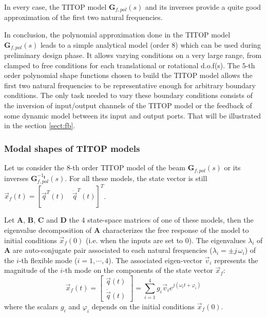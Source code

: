 \documentclass[smallcondensed]{svjour3}     %
\begin{document}
In every case, the TITOP model $\mathbf{G}_{f,pol}(s)$ and its inverses provide a quite good approximation of the first two natural frequencies.

In conclusion, the polynomial approximation done in the TITOP model $\mathbf{G}_{f,pol}(s)$ leads to a simple analytical model (order $8$) which can be used during preliminary design phase. It allows varying conditions on a very large range, from clamped to free conditions for each translational or rotational d.o.f(s). The $5$-th order polynomial shape functions chosen to build the TITOP model allows the first two natural frequencies to be representative enough for arbitrary boundary conditions. The only task needed to vary these boundary conditions consists of the inversion of input/output channels of the TITOP model or the feedback of some dynamic model between its input and output ports. That will be illustrated in the  section \ref{sect:fb}. 

\subsubsection{Modal shapes of TITOP models }\label{sect:shape}
Let us consider the $8$-th order TITOP model of the beam  $\mathbf{G}_{f,pol}(s)$ or its inverses $\mathbf{G}_{f,pol}^{-1_{\mathbf{I}}}(s)$. For all these models, the state vector is still $\vec{x}_f(t)=[\vec{q}^T(t)\quad \dot{\vec{q}}^T(t)]^T$. 

Let $\mathbf{A}$, $\mathbf{B}$, $\mathbf{C}$ and $\mathbf{D}$ the 4 state-space matrices of one of these models, then the eigenvalue decomposition of $\mathbf{A}$ characterizes the free response of the model to initial conditions $\vec{x}_f(0)$ (i.e. when the inputs are set to $0$). The eigenvalues $\lambda_i$ of $\mathbf{A}$ are auto-conjugate pair associated to each natural frequencies ($\lambda_i=\pm j\,\omega_i$) of the $i$-th flexible mode ($i=1,\cdots,4$). The associated eigen-vector $\vec{v}_i$ represents the magnitude of the $i$-th mode on the components of the state vector $\vec{x}_f$:
\begin{equation}\label{eq:vf}
\vec{x}_f(t)=\left[\begin{array}{c} \vec{q}(t) \\ \dot{\vec{q}}(t)\end{array}\right]=\sum_{i=1}^4g_i\vec{v}_ie^{j(\omega_it+\varphi_i)}
\end{equation}
where the scalars $g_i$ and $\varphi_i$ depends on the initial conditions $\vec{x}_f(0)$. 
\end{document}
